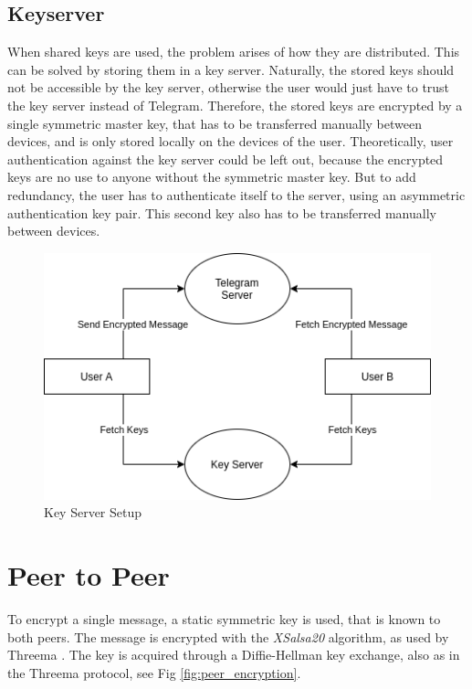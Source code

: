 \documentclass[a4paper, oneside]{discothesis}
\begin{document}
\subsection{Keyserver}

When shared keys are used, the problem arises of how they are distributed. This can be solved by storing them in a key server. Naturally, the stored keys should not be accessible by the key server, otherwise the user would just have to trust the key server instead of Telegram. Therefore, the stored keys are encrypted by a single symmetric master key, that has to be transferred manually between devices, and is only stored locally on the devices of the user. Theoretically, user authentication against the key server could be left out, because the encrypted keys are no use to anyone without the symmetric master key. But to add redundancy, the user has to authenticate itself to the server, using an asymmetric authentication key pair. This second key also has to be transferred manually between devices.


\begin{figure}[h!]
    \centering
    \includegraphics[width=\columnwidth]{figures/structure.png}
    \caption{Key Server Setup}
    \label{fig:structure}
\end{figure}




\section{Peer to Peer}
To encrypt a single message, a static symmetric key is used, that is known to both peers. The message is encrypted with the \emph{XSalsa20} algorithm, as used by Threema \cite{Threema}. The key is acquired through a Diffie-Hellman key exchange, also as in the Threema protocol, see Fig \ref{fig:peer_encryption}.
\end{document}
